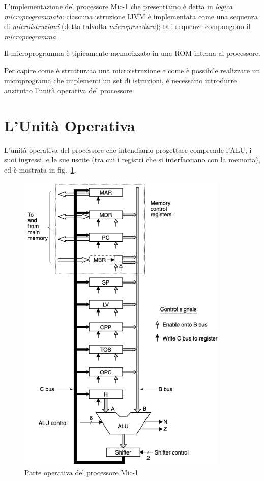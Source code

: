 \documentclass[a4paper,12pt]{scrreprt}
\begin{document}
L'implementazione del processore Mic-1 che presentiamo è detta in \textit{logica
  microprogrammata}: ciascuna istruzione IJVM è implementata come una sequenza
di \textit{microistruzioni} (detta talvolta \textit{microprocedura}); tali
sequenze compongono il \textit{microprogramma}.

\begin{mynote}{}{}
  Il microprogramma è tipicamente memorizzato in una ROM interna al processore.
\end{mynote}

Per capire come è strutturata una microistruzione e come è possibile realizzare
un microprograma che implementi un set di istruzioni, è necessario introdurre
anzitutto l'unità operativa del processore.

\section{L'Unità Operativa}
L'unità operativa del processore che intendiamo progettare comprende l'ALU, i
suoi ingressi, e le sue uscite (tra cui i registri che si interfacciano con la
memoria), ed è mostrata in fig.~\ref{fig:datapath}.

\begin{figure}
  \centering
  \includegraphics[width=0.9\textwidth]{datapath.png}
  \caption{Parte operativa del processore Mic-1}\label{fig:datapath}
\end{figure}
\end{document}
